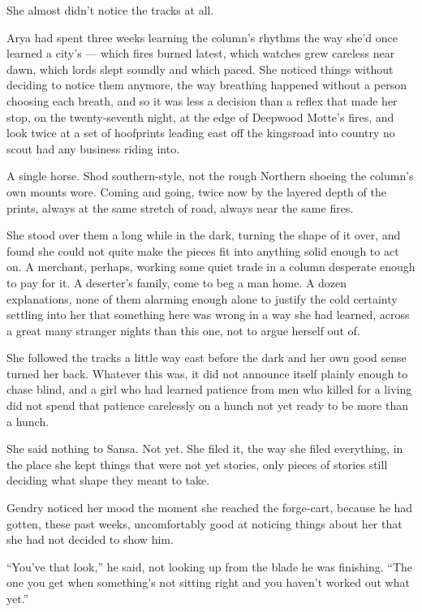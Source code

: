 She almost didn’t notice the tracks at all.

Arya had spent three weeks learning the column’s rhythms the way she’d once learned a city’s — which fires burned latest, which watches grew careless near dawn, which lords slept soundly and which paced. She noticed things without deciding to notice them anymore, the way breathing happened without a person choosing each breath, and so it was less a decision than a reflex that made her stop, on the twenty-seventh night, at the edge of Deepwood Motte’s fires, and look twice at a set of hoofprints leading east off the kingsroad into country no scout had any business riding into.

A single horse. Shod southern-style, not the rough Northern shoeing the column’s own mounts wore. Coming and going, twice now by the layered depth of the prints, always at the same stretch of road, always near the same fires.

She stood over them a long while in the dark, turning the shape of it over, and found she could not quite make the pieces fit into anything solid enough to act on. A merchant, perhaps, working some quiet trade in a column desperate enough to pay for it. A deserter’s family, come to beg a man home. A dozen explanations, none of them alarming enough alone to justify the cold certainty settling into her that something here was wrong in a way she had learned, across a great many stranger nights than this one, not to argue herself out of.

She followed the tracks a little way east before the dark and her own good sense turned her back. Whatever this was, it did not announce itself plainly enough to chase blind, and a girl who had learned patience from men who killed for a living did not spend that patience carelessly on a hunch not yet ready to be more than a hunch.

She said nothing to Sansa. Not yet. She filed it, the way she filed everything, in the place she kept things that were not yet stories, only pieces of stories still deciding what shape they meant to take.

\sceneBreak

Gendry noticed her mood the moment she reached the forge-cart, because he had gotten, these past weeks, uncomfortably good at noticing things about her that she had not decided to show him.

“You’ve that look,” he said, not looking up from the blade he was finishing. “The one you get when something’s not sitting right and you haven’t worked out what yet.”

